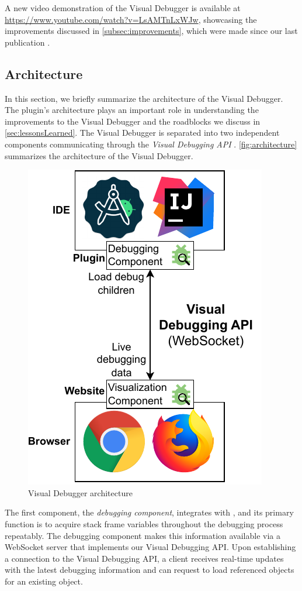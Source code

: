 \documentclass[sigconf]{acmart}
\begin{document}
A new video demonstration of the Visual Debugger is available at \url{https://www.youtube.com/watch?v=LsAMTnLxWJw}, showcasing the improvements discussed in \autoref{subsec:improvements}, which were made since our last publication \cite{krauterVisualDebuggerTool2022}.

\subsection{Architecture}
In this section, we briefly summarize the architecture of the Visual Debugger.
The plugin's architecture plays an important role in understanding the improvements to the Visual Debugger and the roadblocks we discuss in \autoref{sec:lessonsLearned}.
The Visual Debugger is separated into two independent components communicating through the \textit{Visual Debugging API} \cite{krauterVisualDebuggerTool2022}.
\autoref{fig:architecture} summarizes the architecture of the Visual Debugger.

\begin{figure}[ht]
  \centering
  \includegraphics[width=0.7\linewidth]{images/visual-debugger-architecture.pdf}
  \caption{Visual Debugger architecture}
  \label{fig:architecture}
\end{figure}

The first component, the \textit{debugging component}, integrates with \intellij{}, and its primary function is to acquire stack frame variables throughout the debugging process repeatably.
The debugging component makes this information available via a WebSocket server that implements our Visual Debugging API.
Upon establishing a connection to the Visual Debugging API, a client receives real-time updates with the latest debugging information and can request to load referenced objects for an existing object.
\end{document}

